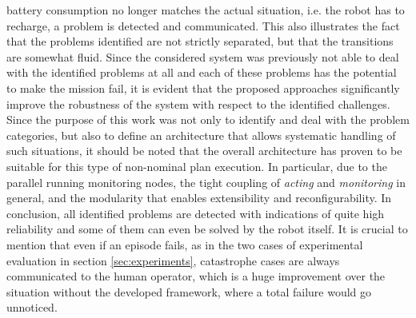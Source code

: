 \documentclass[english, master, utf8]{base/thesis_KBS}
\begin{document}
battery consumption no longer matches the actual situation, i.e. the robot has to recharge, a problem is detected and communicated. This also illustrates the fact that the problems
identified are not strictly separated, but that the transitions are somewhat fluid. Since the considered system was previously not able to deal with the identified problems at all
and each of these problems has the potential to make the mission fail, it is evident that the proposed approaches significantly improve the robustness of the system with respect to
the identified challenges. Since the purpose of this work was not only to identify and deal with the problem categories, but also to define an architecture that allows systematic
handling of such situations, it should be noted that the overall architecture has proven to be suitable for this type of non-nominal plan execution. In particular, due to the parallel
running monitoring nodes, the tight coupling of \textit{acting} and \textit{monitoring} in general, and the modularity that enables extensibility and reconfigurability.
In conclusion, all identified problems are detected with indications of quite high reliability and some of them can even be solved by the robot itself.
It is crucial to mention that even if an episode fails, as in the two cases of experimental evaluation in section \ref{sec:experiments}, catastrophe cases are always communicated to
the human operator, which is a huge improvement over the situation without the developed framework, where a total failure would go unnoticed.\newline
\end{document}
